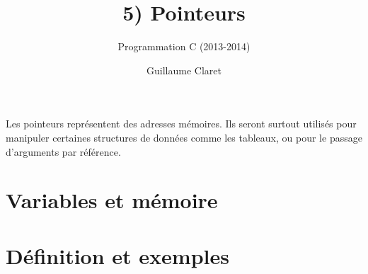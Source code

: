 \documentclass[a4paper,10pt]{article}
\begin{document}
  \title{5) Pointeurs}
  \author{Programmation C (2013-2014)}
  \date{Guillaume Claret}
  \maketitle
  
  Les pointeurs représentent des adresses mémoires. Ils seront surtout utilisés pour manipuler certaines structures de données comme les tableaux, ou pour le passage d'arguments par référence.
  
  \section{Variables et mémoire}
  
  \section{Définition et exemples}
  
\end{document}
